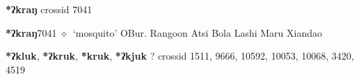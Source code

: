 \item
\textbf{*ʔkraŋ}
  {\tiny crossid 7041}
  \begin{list}{}{\leftmargin=1.5em \itemindent=-1.5em}
  \item {\footnotesize \textbf{*ʔkraŋ}}{\tiny 7041}
         $\diamond$~`mosquito'
         OBur. 
\hspace{1ex}
         Rangoon 
\hspace{1ex}
         Atsi 
\hspace{1ex}
         Bola 
\hspace{1ex}
         Lashi 
\hspace{1ex}
         Maru 
\hspace{1ex}
         Xiandao 
  \end{list}
\item
\textbf{*ʔkluk}, \textbf{*ʔkruk}, \textbf{*kruk}, \textbf{*ʔkjuk}
?
  {\tiny crossid 1511, 9666, 10592, 10053, 10068, 3420, 4519}
